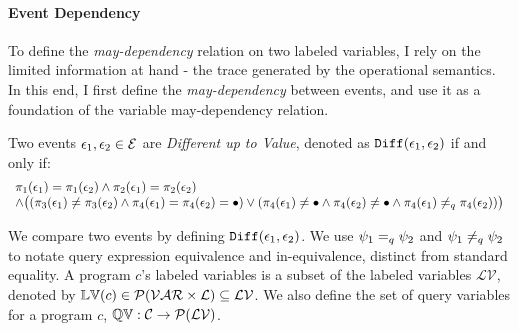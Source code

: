 \paragraph{Event Dependency}
 To define the \emph{may-dependency} relation on two labeled variables, I rely on the limited information at hand - the trace generated by the operational semantics. In this end, 
 I first define the \emph{may-dependency} between events, and use it as a foundation of the variable may-dependency relation.
\begin{defn}
  Two events $\mathtt{\epsilon}_1, \mathtt{\epsilon}_2 \in \mathcal{E}$ are  \emph{Different up to Value}, 
  denoted as $\mathtt{Diff}(\mathtt{\epsilon}_1, \mathtt{\epsilon}_2)$ if and only if:
  \[
    \begin{array}{l}
  \pi_1(\mathtt{\epsilon}_1) = \pi_1(\mathtt{\epsilon}_2) 
  \land  
  \pi_2(\mathtt{\epsilon}_1) = \pi_2(\mathtt{\epsilon}_2) \\
  \land  
  \big(
    (\pi_3(\mathtt{\epsilon}_1) \neq \pi_3(\mathtt{\epsilon}_2)
  \land 
  \pi_{4}(\mathtt{\epsilon}_1) = \pi_{4}(\mathtt{\epsilon}_2) = \bullet )
  \lor 
  (\pi_4(\mathtt{\epsilon}_1) \neq \bullet
  \land 
  \pi_4(\mathtt{\epsilon}_2) \neq \bullet
  \land 
  \pi_{4}(\mathtt{\epsilon}_1) \neq_q \pi_{4}(\mathtt{\epsilon}_2)) 
  \big)
  \end{array}
  \]
  \end{defn}
 We compare two events by defining $\mathtt{Diff}(\mathtt{\epsilon}_1, \mathtt{\epsilon}_2)$. We use $\psi_1 =_{q} \psi_2$ and $\psi_1 \neq_{q} \psi_2$ to notate query expression equivalence and in-equivalence, distinct from standard equality. A program $c$'s
 labeled variables 
is a subset of
the labeled variables $\mathcal{LV}$, denoted by $\mathbb{LV}(c) \in \mathcal{P}(\mathcal{VAR} \times \mathcal{L}) \subseteq \mathcal{LV}$.
We also define the set of query variables for a program $c$, $\mathbb{QV}: \mathcal{C} \to 
\mathcal{P}(\mathcal{LV})$.


